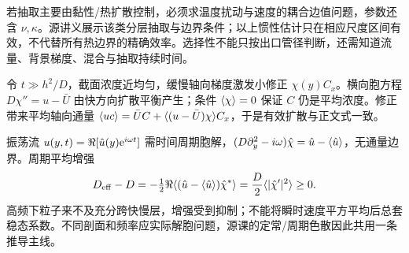 若抽取主要由黏性/热扩散控制，必须求温度扰动与速度的耦合边值问题，参数还含 $\nu,\kappa$。源讲义展示该类分层抽取与边界条件；以上惯性估计只在相应尺度区间有效，不代替所有热边界的精确效率。选择性不能只按出口管径判断，还需知道流量、背景梯度、混合与抽取持续时间。

令 $t\gg h^2/D$，截面浓度近均匀，缓慢轴向梯度激发小修正 $\chi(y)C_x$。横向胞方程 $D\chi''=u-\bar U$ 由快方向扩散平衡产生；条件 $\langle \chi\rangle=0$ 保证 $C$ 仍是平均浓度。修正带来平均轴向通量 $\langle uc\rangle=\bar UC+\langle (u-\bar U)\chi\rangle C_x$，于是有效扩散与正文式一致。

振荡流 $u(y,t)=\Re[\hat u(y)\mathrm e^{i\omega t}]$ 需时间周期胞解，$(D\partial_y^2-i\omega)\hat\chi=\hat u-\langle \hat u\rangle$，无通量边界。周期平均增强
\[
D_{\rm eff}-D=-\tfrac12\Re\langle (\hat u-\langle \hat u\rangle)\hat\chi^*\rangle
=\frac D2\langle |\hat\chi'|^2\rangle\ge0.
\]
高频下粒子来不及充分跨快慢层，增强受到抑制；不能将瞬时速度平方平均后总套稳态系数。不同剖面和频率应实际解胞问题，源课的定常/周期色散因此共用一条推导主线。
